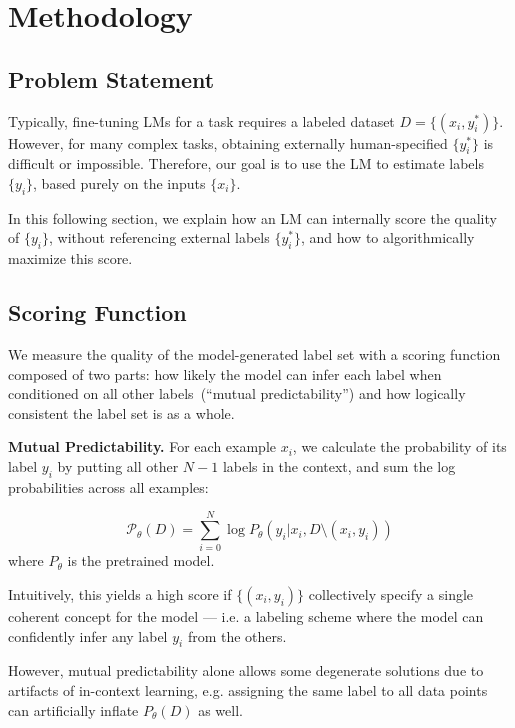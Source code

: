 \documentclass{article}
\begin{document}
\section{Methodology} \label{sec:task}

\subsection{Problem Statement} 


Typically, fine-tuning LMs for a task requires a labeled dataset $D=\{(x_i, y_i^*)\}$. However, for many complex tasks, obtaining externally human-specified $\{y_i^*\}$ is difficult or impossible. Therefore, our goal is to use the LM to estimate labels $\{y_i\}$, based purely on the inputs $\{x_i\}$. 

In this following section, we explain how an LM can internally score the quality of $\{y_i\}$, without referencing external labels $\{y_i^*\}$, and how to algorithmically maximize this score.


\subsection{Scoring Function}
\label{sec:scoring-function}


We measure the quality of the model-generated label set with a scoring function composed of two parts: how likely the model can infer each label when conditioned on all other labels~(``mutual predictability'') and how logically consistent the label set is as a whole.

\textbf{Mutual Predictability.} 
For each example $x_i$, we calculate the probability of its label $y_i$ by putting all other $N-1$ labels in the context, and sum the log probabilities across all examples: 

$$\mathcal{P}_\theta(D) = \sum_{i=0}^N\log P_\theta(y_i|x_i, D \setminus (x_i, y_i)) $$
where $P_\theta$ is the pretrained model.

Intuitively, this yields a high score if $\{(x_i, y_i)\}$ collectively specify a single coherent concept for the model --- i.e. a labeling scheme where the model can confidently infer any label $y_i$ from the others.


However, mutual predictability alone allows some degenerate solutions due to artifacts of in-context learning, e.g. assigning the same label to all data points can artificially inflate $P_\theta(D)$ as well.
\end{document}

